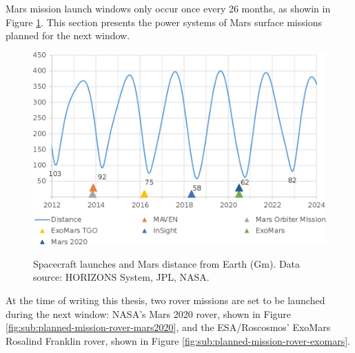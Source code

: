 Mars mission launch windows only occur once every 26 months, as showin in Figure \ref{fig:mars-distance-from-earth}. This section presents the power systems of Mars surface missions planned for the next window.

\begin{figure}[h]
  \captionsetup[subfigure]{justification=centering}
  \centering
  \hypersetup{linkcolor=captionTextColor}
  \includegraphics[width=0.5\linewidth]{sections/state-of-the-art/planned-missions/plots/mars-distance-from-earth.png}\\
  \caption[Spacecraft launches and Mars distance from Earth]
          {Spacecraft launches and Mars distance from Earth (Gm). Data source: HORIZONS System, JPL, NASA.}
  \label{fig:mars-distance-from-earth}
\end{figure}

At the time of writing this thesis, two rover missions are set to be launched during the next window: \ac{NASA}'s Mars 2020 rover, shown in Figure \ref{fig:sub:planned-mission-rover-mars2020}, and the \ac{ESA}/Roscosmos' ExoMars Rosalind Franklin rover, shown in Figure \ref{fig:sub:planned-mission-rover-exomars}.

\vspace{0.5cm}

